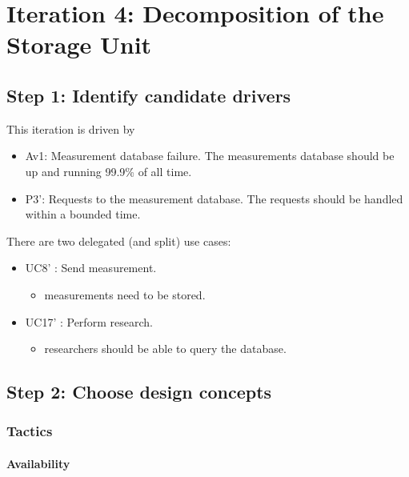 \section{Iteration 4: Decomposition of the Storage Unit}
\label{add:it4}

\subsection{Step 1: Identify candidate drivers}
\label{add:it4/drivers}

\npar This iteration is driven by

\begin{itemize}
	\item Av1: Measurement database failure. The measurements database should be up
	and running 99.9\% of all time. 
  	\item P3': Requests to the measurement database. The requests should be
  	handled within a bounded time. 
\end{itemize}

\npar There are two delegated (and split) use cases:

\begin{itemize}
  \item UC8' : Send measurement.
  \begin{itemize}
  	\item measurements need to be stored.
  \end{itemize}
  \item UC17' : Perform research.
  \begin{itemize}
  	\item researchers should be able to query the database. 
  \end{itemize}
\end{itemize}

\subsection{Step 2: Choose design concepts}
\label{add:it4/concepts}

\subsubsection{Tactics}
\label{add:it4/tactics}

\paragraph{Availability} 


